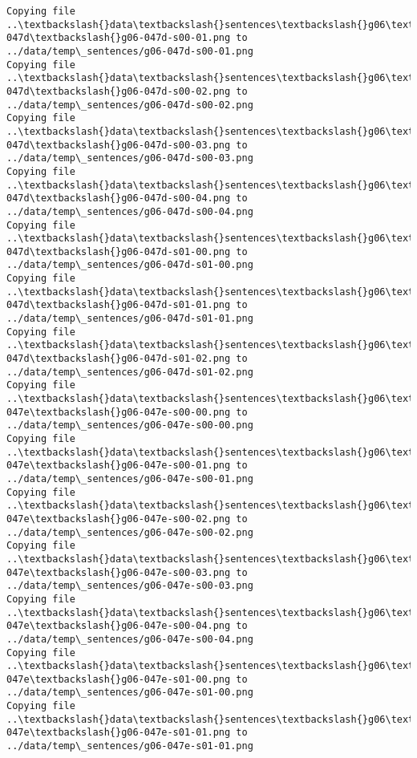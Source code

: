 \documentclass[11pt]{article}
\begin{document}
\begin{Verbatim}[commandchars=\\\{\}]
Copying file ..\textbackslash{}data\textbackslash{}sentences\textbackslash{}g06\textbackslash{}g06-047d\textbackslash{}g06-047d-s00-01.png to
../data/temp\_sentences/g06-047d-s00-01.png
Copying file ..\textbackslash{}data\textbackslash{}sentences\textbackslash{}g06\textbackslash{}g06-047d\textbackslash{}g06-047d-s00-02.png to
../data/temp\_sentences/g06-047d-s00-02.png
Copying file ..\textbackslash{}data\textbackslash{}sentences\textbackslash{}g06\textbackslash{}g06-047d\textbackslash{}g06-047d-s00-03.png to
../data/temp\_sentences/g06-047d-s00-03.png
Copying file ..\textbackslash{}data\textbackslash{}sentences\textbackslash{}g06\textbackslash{}g06-047d\textbackslash{}g06-047d-s00-04.png to
../data/temp\_sentences/g06-047d-s00-04.png
Copying file ..\textbackslash{}data\textbackslash{}sentences\textbackslash{}g06\textbackslash{}g06-047d\textbackslash{}g06-047d-s01-00.png to
../data/temp\_sentences/g06-047d-s01-00.png
Copying file ..\textbackslash{}data\textbackslash{}sentences\textbackslash{}g06\textbackslash{}g06-047d\textbackslash{}g06-047d-s01-01.png to
../data/temp\_sentences/g06-047d-s01-01.png
Copying file ..\textbackslash{}data\textbackslash{}sentences\textbackslash{}g06\textbackslash{}g06-047d\textbackslash{}g06-047d-s01-02.png to
../data/temp\_sentences/g06-047d-s01-02.png
Copying file ..\textbackslash{}data\textbackslash{}sentences\textbackslash{}g06\textbackslash{}g06-047e\textbackslash{}g06-047e-s00-00.png to
../data/temp\_sentences/g06-047e-s00-00.png
Copying file ..\textbackslash{}data\textbackslash{}sentences\textbackslash{}g06\textbackslash{}g06-047e\textbackslash{}g06-047e-s00-01.png to
../data/temp\_sentences/g06-047e-s00-01.png
Copying file ..\textbackslash{}data\textbackslash{}sentences\textbackslash{}g06\textbackslash{}g06-047e\textbackslash{}g06-047e-s00-02.png to
../data/temp\_sentences/g06-047e-s00-02.png
Copying file ..\textbackslash{}data\textbackslash{}sentences\textbackslash{}g06\textbackslash{}g06-047e\textbackslash{}g06-047e-s00-03.png to
../data/temp\_sentences/g06-047e-s00-03.png
Copying file ..\textbackslash{}data\textbackslash{}sentences\textbackslash{}g06\textbackslash{}g06-047e\textbackslash{}g06-047e-s00-04.png to
../data/temp\_sentences/g06-047e-s00-04.png
Copying file ..\textbackslash{}data\textbackslash{}sentences\textbackslash{}g06\textbackslash{}g06-047e\textbackslash{}g06-047e-s01-00.png to
../data/temp\_sentences/g06-047e-s01-00.png
Copying file ..\textbackslash{}data\textbackslash{}sentences\textbackslash{}g06\textbackslash{}g06-047e\textbackslash{}g06-047e-s01-01.png to
../data/temp\_sentences/g06-047e-s01-01.png

\end{Verbatim}
\end{document}
